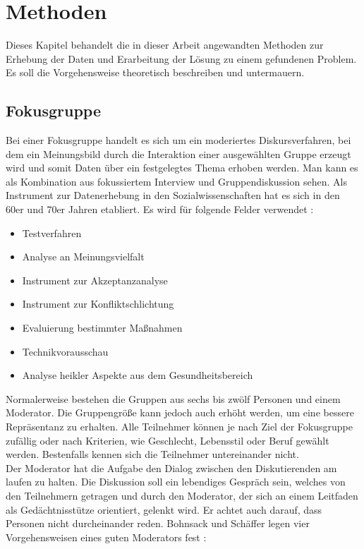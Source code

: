 \chapter{Methoden}

Dieses Kapitel behandelt die in dieser Arbeit angewandten Methoden zur Erhebung der Daten und Erarbeitung der Lösung zu einem gefundenen Problem. Es soll die Vorgehensweise theoretisch beschreiben und untermauern.

\section{Fokusgruppe}
\label{sec:fokus}

Bei einer Fokusgruppe handelt es sich um ein moderiertes Diskursverfahren, bei dem ein Meinungsbild durch die Interaktion einer ausgewählten Gruppe erzeugt wird und somit Daten über ein festgelegtes Thema erhoben werden. Man kann es als Kombination aus fokussiertem Interview und Gruppendiskussion sehen. Als Instrument zur Datenerhebung in den Sozialwissenschaften hat es sich in den 60er und 70er Jahren etabliert. Es wird für folgende Felder verwendet \cite{schulz_quick_2012}:

\begin{itemize}
	\item Testverfahren
	\item Analyse an Meinungsvielfalt
	\item Instrument zur Akzeptanzanalyse
	\item Instrument zur Konfliktschlichtung
	\item Evaluierung bestimmter Maßnahmen
	\item Technikvorausschau
	\item Analyse heikler Aspekte aus dem Gesundheitsbereich
\end{itemize}

Normalerweise bestehen die Gruppen aus sechs bis zwölf Personen und einem Moderator. Die Gruppengröße kann jedoch auch erhöht werden, um eine bessere Repräsentanz zu erhalten. Alle Teilnehmer können je nach Ziel der Fokusgruppe zufällig oder nach Kriterien, wie Geschlecht, Lebensstil oder Beruf gewählt werden. Bestenfalls kennen sich die Teilnehmer untereinander nicht. \\
Der Moderator hat die Aufgabe den Dialog zwischen den Diskutierenden am laufen zu halten. Die Diskussion soll ein lebendiges Gespräch sein, welches von den Teilnehmern getragen und durch den Moderator, der sich an einem Leitfaden als Gedächtnisstütze orientiert, gelenkt wird. Er achtet auch darauf, dass Personen nicht durcheinander reden. Bohnsack und Schäffer legen vier Vorgehensweisen eines guten Moderators fest \cite{bohnsack_gruppendiskussionsverfahren_2001}:


